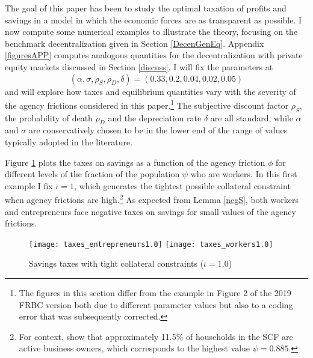 \documentclass[11pt]{article}
\theoremstyle{plain}
\theoremstyle{definition} %
\begin{document}
The goal of this paper has been to study the optimal taxation of profits and savings in a model in which the economic forces are as transparent as possible. I now compute some numerical examples to illustrate the theory, focusing on the benchmark decentralization given in Section \ref{DecenGenEq}. Appendix \ref{figuresAPP} computes analogous quantities for the decentralization with private equity markets discussed in Section \ref{discuss}. I will fix the parameters at
\begin{equation} %
(\alpha, \sigma, \rho_S, \rho_D, \delta) = (0.33, 0.2, 0.04, 0.02, 0.05)
\label{standardPARAMS}
\end{equation} %
and will explore how taxes and equilibrium quantities vary with the severity of the agency frictions considered in this paper.\footnote{The figures in this section differ from the example in Figure 2 of the 2019 FRBC version both due to different parameter values but also to a coding error that was subsequently corrected.} The subjective discount factor $\rho_S$, the probability of death $\rho_D$ and the depreciation rate $\delta$ are all standard, while $\alpha$ and $\sigma$ are conservatively chosen to be in the lower end of the range of values typically adopted in the literature. 

Figure \ref{tax} plots the taxes on savings as a function of the agency friction $\phi$ for different levels of the fraction of the population $\psi$ who are workers. In this first example I fix $\overline{\iota}=1$, which generates the tightest possible collateral constraint when agency frictions are high.\footnote{For context, \cite{cagetti_entrepreneurship_2006} show that approximately 11.5\% of households in the SCF are active business owners, which corresponds to the highest value $\psi = 0.885$.} As expected from Lemma \ref{negS}, both workers and entrepreneurs face negative taxes on savings for small values of the agency frictions. 

\begin{figure}[H]
\centering
\caption{Savings taxes with tight collateral constraints ($\overline{\iota}=1.0$)}
\texttt{[image: taxes\_entrepreneurs1.0]}
\texttt{[image: taxes\_workers1.0]}
\label{tax} 
\end{figure} 
\end{document}
